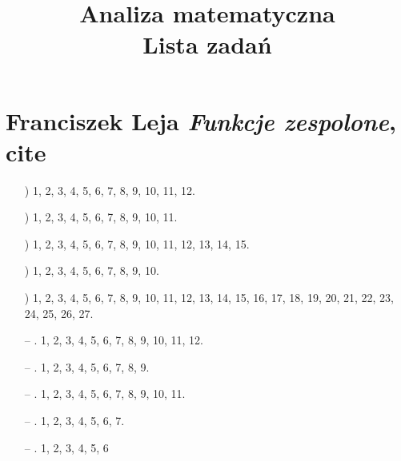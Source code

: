 \documentclass[a4paper,11pt]{article}
\title{Analiza matematyczna \\
  {\Large Lista zadań}}
\numberwithin{equation}{section}
\begin{document}





\maketitle





\section{Franciszek Leja \textit{Funkcje zespolone}, cite{}}

\label{sec:Oznaczenia-i-konwencje}


\begin{itemize}

\item[\romannumeral1)] 1, 2, 3, 4, 5, 6, 7, 8, 9, 10, 11, 12.

\item[\romannumeral2)] 1, 2, 3, 4, 5, 6, 7, 8, 9, 10, 11.

\item[\romannumeral3)] 1, 2, 3, 4, 5, 6, 7, 8, 9, 10, 11, 12, 13, 14, 15.

\item[\romannumeral4)] 1, 2, 3, 4, 5, 6, 7, 8, 9, 10.

\item[\romannumeral5)] 1, 2, 3, 4, 5, 6, 7, 8, 9, 10, 11, 12, 13, 14, 15,
  16, 17, 18, 19, 20, 21, 22, 23, 24, 25, 26, 27.

\item[--] . 1, 2, 3, 4, 5, 6, 7, 8, 9, 10, 11, 12.

\item[--] . 1, 2, 3, 4, 5, 6, 7, 8, 9.

\item[--] . 1, 2, 3, 4, 5, 6, 7, 8, 9, 10, 11.

\item[--] . 1, 2, 3, 4, 5, 6, 7.

\item[--] . 1, 2, 3, 4, 5, 6

\end{itemize}
\end{document}

